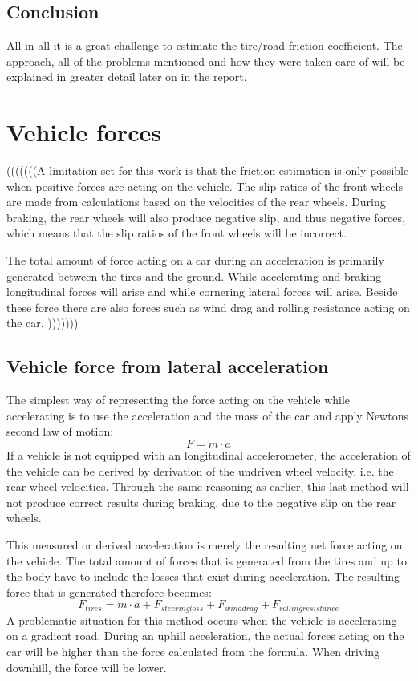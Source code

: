 \subsection{Conclusion}
All in all it is a great challenge to estimate the tire/road friction coefficient.  The approach, all of the problems mentioned and how they were taken care of will be explained in greater detail later on in the report.


\section{Vehicle forces}

(((((((A limitation set for this work is that the friction estimation is only possible when positive forces are acting on the vehicle. The slip ratios of the front wheels are made from calculations based on the velocities of the rear wheels. During braking, the rear wheels will also produce negative slip, and thus negative forces, which means that the slip ratios of the front wheels will be incorrect. 

The total amount of force acting on a car during an acceleration is primarily generated between the tires and the ground. While accelerating and braking longitudinal forces will arise and while cornering lateral forces will arise. Beside these force there are also forces such as wind drag and rolling resistance acting on the car. )))))))


\subsection{Vehicle force from lateral acceleration}


The simplest way of representing the force acting on the vehicle while accelerating is to use the acceleration and the mass of the car and apply Newtons second law of motion:
\begin{equation}
	F = m \cdot a
\end{equation}
If a vehicle is not equipped with an longitudinal accelerometer, the acceleration of the vehicle can be derived by derivation of the undriven wheel velocity, i.e. the rear wheel velocities. Through the same reasoning as earlier, this last method will not produce correct results during braking, due to the negative slip on the rear wheels. 

This measured or derived acceleration is merely the resulting net force acting on the vehicle. The total amount of forces that is generated from the tires and up to the body have to include the losses that exist during acceleration. The resulting force that is generated therefore becomes: 
\begin{equation}
F_{tires} = m \cdot a + F_{steering loss} + F_{wind drag} + F_{rolling resistance}
\end{equation}
A problematic situation for this method occurs when the vehicle is accelerating on a gradient road. During an uphill acceleration, the actual forces acting on the car will be higher than the force calculated from the formula. When driving downhill, the force will be lower. 

